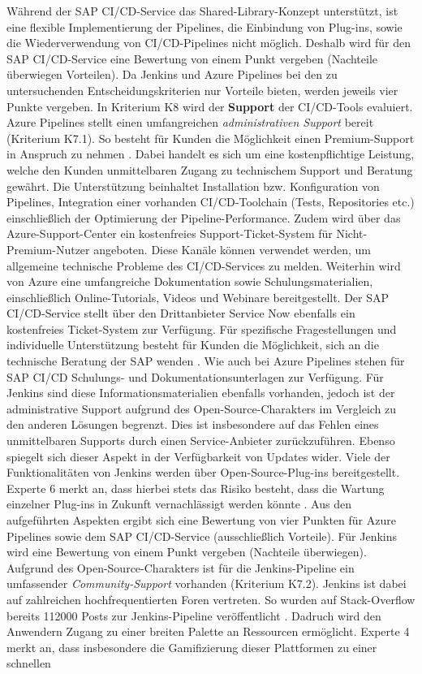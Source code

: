 \vspace*{-15mm}
Während der SAP CI/CD-Service das Shared-Library-Konzept unterstützt, ist eine flexible Implementierung der Pipelines, die Einbindung von Plug-ins, sowie die Wiederverwendung von CI/CD-Pipelines nicht möglich. Deshalb wird für den SAP CI/CD-Service eine Bewertung von einem Punkt vergeben (Nachteile überwiegen Vorteilen). Da Jenkins und Azure Pipelines bei den zu untersuchenden Entscheidungskriterien nur Vorteile bieten, werden jeweils vier Punkte vergeben. In Kriterium K8 wird der \textbf{Support} der CI/CD-Tools evaluiert. Azure Pipelines stellt einen umfangreichen \textit{administrativen Support} bereit (Kriterium K7.1). So besteht für Kunden die Möglichkeit einen Premium-Support in Anspruch zu nehmen \cite{.20230410e}. Dabei handelt es sich um eine kostenpflichtige Leistung, welche den Kunden unmittelbaren Zugang zu technischem Support und Beratung gewährt. Die Unterstützung beinhaltet Installation bzw. Konfiguration von Pipelines, Integration einer vorhanden CI/CD-Toolchain (Tests, Repositories etc.) einschließlich der Optimierung der Pipeline-Performance. Zudem wird über das Azure-Support-Center ein kostenfreies Support-Ticket-System für Nicht-Premium-Nutzer angeboten. Diese Kanäle können verwendet werden, um allgemeine technische Probleme des CI/CD-Services zu melden. Weiterhin wird von Azure eine umfangreiche Dokumentation sowie Schulungsmaterialien, einschließlich Online-Tutorials, Videos und Webinare bereitgestellt. Der SAP CI/CD-Service stellt über den Drittanbieter Service Now ebenfalls ein kostenfreies Ticket-System zur Verfügung. Für spezifische Fragestellungen und individuelle Unterstützung besteht für Kunden die Möglichkeit, sich an die technische Beratung der SAP wenden \cite[Z. 109 ff.]{ProductOwnerSAPBTPProd&Infra.}. Wie auch bei Azure Pipelines stehen für SAP CI/CD Schulungs- und Dokumentationsunterlagen zur Verfügung. Für Jenkins sind diese Informationsmaterialien ebenfalls vorhanden, jedoch ist der administrative Support aufgrund des Open-Source-Charakters im Vergleich zu den anderen Lösungen begrenzt. Dies ist insbesondere auf das Fehlen eines unmittelbaren Supports durch einen Service-Anbieter zurückzuführen. Ebenso spiegelt sich dieser Aspekt in der Verfügbarkeit von Updates wider. Viele der Funktionalitäten von Jenkins werden über Open-Source-Plug-ins bereitgestellt. Experte 6 merkt an, dass hierbei stets das Risiko besteht, dass die Wartung einzelner Plug-ins in Zukunft vernachlässigt werden könnte \cite[Z.30]{FullStackEntwicklerSAPDTSIntegration.}. Aus den aufgeführten Aspekten ergibt sich eine Bewertung von vier Punkten für Azure Pipelines sowie dem SAP CI/CD-Service (ausschließlich Vorteile). Für Jenkins wird eine Bewertung von einem Punkt vergeben (Nachteile überwiegen). Aufgrund des Open-Source-Charakters ist für die Jenkins-Pipeline ein umfassender \textit{Community-Support} vorhanden (Kriterium K7.2). Jenkins ist dabei auf zahlreichen hochfrequentierten Foren vertreten. So wurden auf Stack-Overflow bereits 112000 Posts zur Jenkins-Pipeline veröffentlicht \cite{StackOverflow.20230403d}. Dadruch wird den Anwendern Zugang zu einer breiten Palette an Ressourcen ermöglicht. Experte 4 merkt an, dass insbesondere die Gamifizierung dieser Plattformen zu einer schnellen 